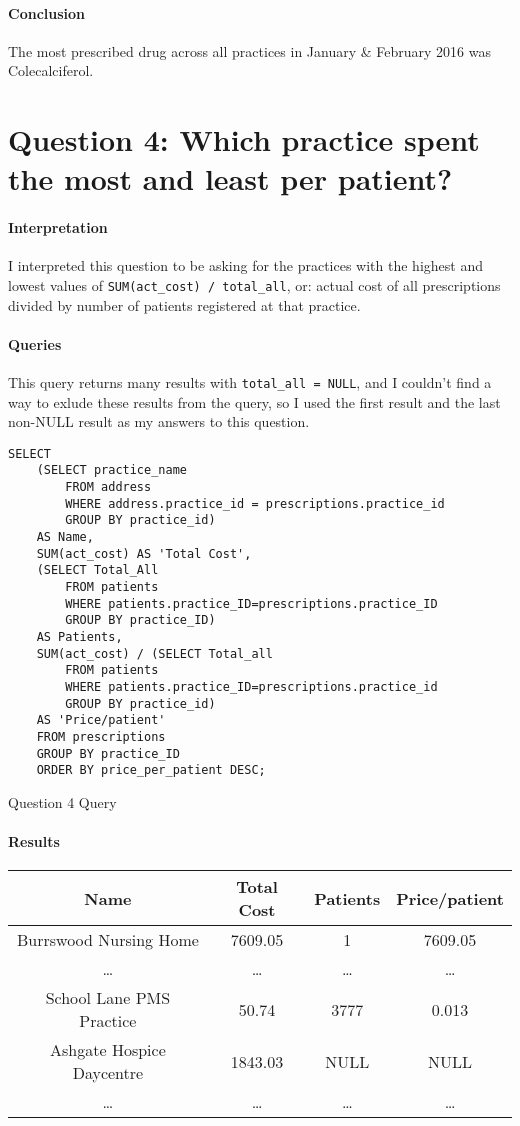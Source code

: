 \documentclass{report}
\begin{document}
\paragraph{Conclusion}
The most prescribed drug across all practices in January \& February 2016 was Colecalciferol.

\section{Question 4: Which practice spent the most and least per patient?}
\paragraph{Interpretation}
I interpreted this question to be asking for the practices with the highest and lowest values of \texttt{SUM(act\_cost) / total\_all}, or: actual cost of all prescriptions divided by number of patients registered at that practice.
\paragraph{Queries}
This query returns many results with \texttt{total\_all = NULL}, and I couldn't find a way to exlude these results from the query, so I used the first result and the last non-NULL result as my answers to this question.

\begin{listing}[H]
\begin{verbatim}
SELECT
    (SELECT practice_name 
        FROM address 
        WHERE address.practice_id = prescriptions.practice_id 
        GROUP BY practice_id) 
    AS Name,
    SUM(act_cost) AS 'Total Cost',
    (SELECT Total_All 
        FROM patients 
        WHERE patients.practice_ID=prescriptions.practice_ID 
        GROUP BY practice_ID) 
    AS Patients,
    SUM(act_cost) / (SELECT Total_all 
        FROM patients 
        WHERE patients.practice_ID=prescriptions.practice_id 
        GROUP BY practice_id) 
    AS 'Price/patient' 
    FROM prescriptions 
    GROUP BY practice_ID 
    ORDER BY price_per_patient DESC;
\end{verbatim}
\caption{Question 4 Query}
\label{lst: Q4-1}
\end{listing}

\paragraph{Results}
\begin{center}
\begin{tabular}{ | c | c | c | c | }
\hline
Name & Total Cost & Patients & Price/patient \\
\hline
Burrswood Nursing Home & 7609.05 & 1 & 7609.05 \\
\hline
\ldots & \ldots & \ldots & \ldots \\
\hline
School Lane PMS Practice & 50.74 & 3777 & 0.013 \\
\hline
Ashgate Hospice Daycentre & 1843.03 & NULL & NULL \\
\hline
\ldots & \ldots & \ldots & \ldots \\
\hline
\end{tabular}
\end{center}
\end{document}
